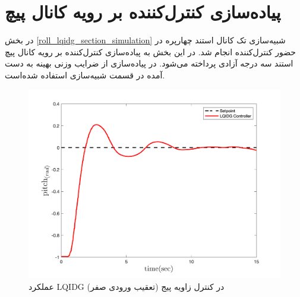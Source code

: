 \section{پیاده‌سازی کنترل‌کننده  بر رویه کانال پیچ}\label{roll_lqidg_section}
در بخش
\ref{roll_lqidg_section_simulation}
شبیه‌سازی تک کانال استند چهارپره در حضور کنترل‌کننده  انجام شد. در این بخش به پیاده‌سازی کنترل‌کننده  بر رویه کانال پیچ استند سه درجه آزادی پرداخته می‌شود.
در پیاده‌سازی از ضرایب وزنی بهینه به دست آمده در قسمت شبیه‌سازی استفاده شده‌است.
\begin{figure}[H]
	\includegraphics[width=.48\linewidth]{../Figures/Calibration/LQIDG/Pitch/lqidg_pitch.png}
	\centering
	\caption{عملكرد LQIDG در کنترل زاويه پیج (تعقیب ورودی صفر)}
\end{figure}


